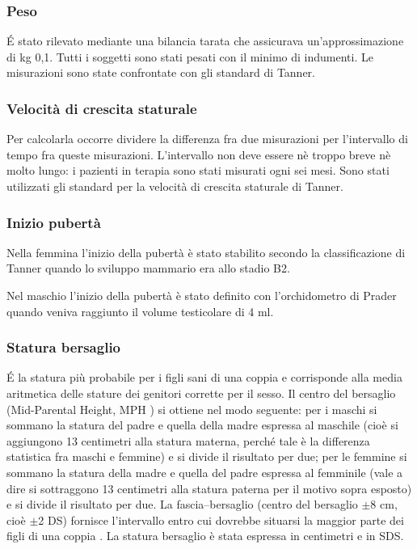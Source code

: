   
\subsubsection*{Peso}
 \'E stato rilevato mediante una bilancia tarata che assicurava un'approssimazione di kg 0,1. Tutti i soggetti sono stati pesati con il minimo di indumenti. Le misurazioni sono state confrontate con gli standard di Tanner\cite{tanner1966standards}. 

\subsubsection*{Velocità di crescita staturale}
Per calcolarla occorre dividere la differenza fra due misurazioni per l'intervallo di tempo fra queste misurazioni. L'intervallo non deve essere nè troppo breve nè molto lungo: i pazienti in terapia sono stati misurati ogni sei mesi. Sono stati utilizzati gli standard per la velocità di crescita staturale di Tanner\cite{tanner1966standards}.

\subsubsection*{Inizio pubertà}
Nella femmina l'inizio della pubertà è stato stabilito secondo la classificazione di Tanner\cite{tanner1990foetus} quando lo sviluppo mammario era allo stadio B2.

Nel maschio l'inizio della pubertà è stato definito con l'orchidometro di Prader quando veniva raggiunto il volume testicolare di 4 ml.


\subsubsection*{Statura bersaglio}
\'E  la statura più probabile per i figli sani di una coppia e corrisponde alla media aritmetica delle stature dei genitori corrette per il sesso. Il centro del bersaglio (Mid-Parental Height, MPH ) si ottiene nel modo seguente: per i maschi si sommano la statura del padre e quella della madre espressa al maschile (cioè si aggiungono 13 centimetri alla statura materna, perché tale è la differenza statistica fra maschi e femmine) e si divide il risultato per due; per le femmine si sommano la statura della madre e quella del padre espressa al femminile (vale a dire si sottraggono 13 centimetri alla statura paterna per il motivo sopra esposto) e si divide il risultato per due. 
La fascia--bersaglio (centro del bersaglio $\pm$8 cm, cioè $\pm$2 DS) fornisce l'intervallo entro cui dovrebbe situarsi la maggior parte dei figli di una coppia \cite{tanner1990foetus}.
La statura bersaglio è stata espressa in centimetri e in SDS.


